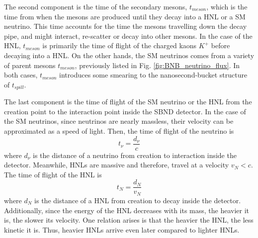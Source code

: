 The second component is the time of the secondary mesons, $t_{meson}$, which is the time from when the mesons are produced until they decay into a HNL or a SM neutrino.
This time accounts for the time the mesons travelling down the decay pipe, and might interact, re-scatter or decay into other mesons.
In the case of the HNL, $t_{meson}$ is primarily the time of flight of the charged kaons $K^+$ before decaying into a HNL.
On the other hands, the SM neutrinos comes from a variety of parent mesons $t_{meson}$, previously listed in Fig. \ref{fig:BNB_neutrino_flux}.
In both cases, $t_{meson}$ introduces some smearing to the nanosecond-bucket structure of $t_{spill}$.

The last component is the time of flight of the SM neutrino or the HNL from the creation point to the interaction point inside the SBND detector.
In the case of the SM neutrinos, since neutrinos are nearly massless, their velocity can be approximated as a speed of light. 
Then, the time of flight of the neutrino is  
\begin{equation}
	t_{\nu} = \frac{d_{\nu}}{c}
\end{equation}
where $d_{\nu}$ is the distance of a neutrino from creation to interaction inside the detector.
Meanwhile, HNLs are massive and therefore, travel at a velocity $v_N < c$.
The time of flight of the HNL is
\begin{equation}
	t_{N} = \frac{d_{N}}{v_N}
\end{equation}
where $d_N$ is the distance of a HNL from creation to decay inside the detector.
Additionally, since the energy of the HNL decreases with its mass, the heavier it is, the slower its velocity.
One relation arises is that the heavier the HNL, the less kinetic it is.
Thus, heavier HNLs arrive even later compared to lighter HNLs.

